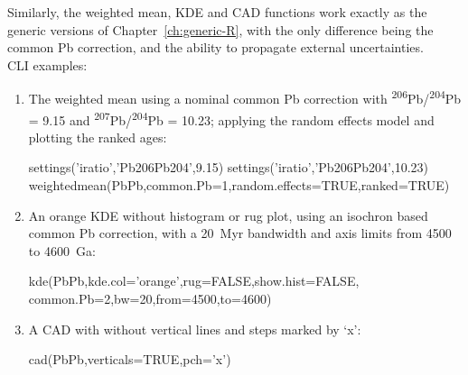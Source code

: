 \begin{refsection}
Similarly, the weighted mean, KDE and CAD functions work exactly as
the generic versions of Chapter~\ref{ch:generic-R}, with the only
difference being the common Pb correction, and the ability to
propagate external uncertainties.\\

\noindent CLI examples:

\begin{enumerate}

\item The weighted mean using a nominal common Pb correction with
  \textsuperscript{206}Pb/\textsuperscript{204}Pb = 9.15 and
  \textsuperscript{207}Pb/\textsuperscript{204}Pb = 10.23; applying
  the random effects model and plotting the ranked ages:
  
\begin{script}
settings('iratio','Pb206Pb204',9.15)
settings('iratio','Pb206Pb204',10.23)
weightedmean(PbPb,common.Pb=1,random.effects=TRUE,ranked=TRUE)
\end{script}

\item An orange KDE without histogram or rug plot, using an isochron
  based common Pb correction, with a 20~Myr bandwidth and axis limits
  from 4500 to 4600~Ga:

\begin{console}
kde(PbPb,kde.col='orange',rug=FALSE,show.hist=FALSE,
    common.Pb=2,bw=20,from=4500,to=4600)
\end{console}

\item A CAD with without vertical lines and steps marked by `x':

\begin{console}
cad(PbPb,verticals=TRUE,pch='x')
\end{console}
  
\end{enumerate}

\printbibliography[heading=subbibliography]

\end{refsection}

